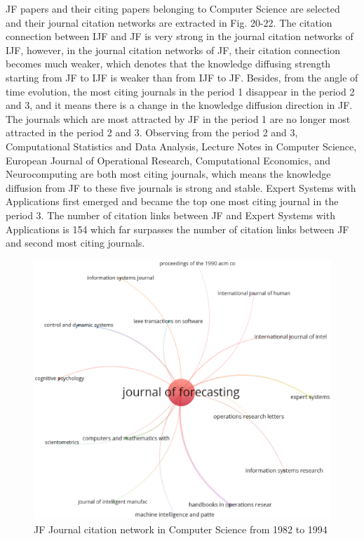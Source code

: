 \documentclass[11pt,a4paper]{elsarticle} %
\begin{document}
JF papers and their citing papers belonging to Computer Science are
selected and their journal citation networks are extracted in Fig.
20-22. The citation connection between IJF and JF is very strong in the
journal citation networks of IJF, however, in the journal citation
networks of JF, their citation connection becomes much weaker, which
denotes that the knowledge diffusing strength starting from JF to IJF is
weaker than from IJF to JF. Besides, from the angle of time evolution,
the most citing journals in the period 1 disappear in the period 2 and
3, and it means there is a change in the knowledge diffusion direction
in JF. The journals which are most attracted by JF in the period 1 are
no longer most attracted in the period 2 and 3. Observing from the
period 2 and 3, Computational Statistics and Data Analysis, Lecture
Notes in Computer Science, European Journal of Operational Research,
Computational Economics, and Neurocomputing are both most citing
journals, which means the knowledge diffusion from JF to these five
journals is strong and stable. Expert Systems with Applications first
emerged and became the top one most citing journal in the period 3. The
number of citation links between JF and Expert Systems with Applications
is 154 which far surpasses the number of citation links between JF and
second most citing journals.

\begin{figure}[htbp]
\centering
\includegraphics[scale=0.4]{fig.20.eps}
\caption{JF Journal citation network in Computer Science from 1982 to 1994}
\end{figure}
\end{document}
